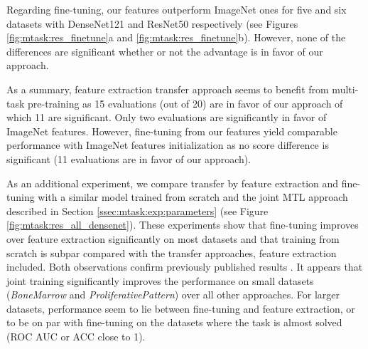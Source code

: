 Regarding fine-tuning, our features outperform ImageNet ones for five and six datasets with DenseNet121 and ResNet50 respectively (see Figures \ref{fig:mtask:res_finetune}a and \ref{fig:mtask:res_finetune}b). However, none of the differences are significant whether or not the advantage is in favor of our approach.

As a summary, feature extraction transfer approach seems to benefit from multi-task pre-training as 15 evaluations (out of 20) are in favor of our approach of which 11 are significant. Only two evaluations are significantly in favor of ImageNet features.  However, fine-tuning from our features yield comparable performance with ImageNet features initialization as no score difference is significant (11 evaluations are in favor of our approach).


As an additional experiment, we compare transfer by feature extraction and fine-tuning with a similar model trained from scratch and the joint MTL approach described in Section \ref{ssec:mtask:exp:parameters} (see Figure \ref{fig:mtask:res_all_densenet}). These experiments show that fine-tuning improves over feature extraction significantly on most datasets and that training from scratch is subpar compared with the transfer approaches, feature extraction included. Both observations confirm previously published results \cite{mormont2018comparison, ponzio2019dealing, tajbakhsh2016convolutional,shin2016deep}. It appears that joint training significantly improves the performance on small datasets (\textit{BoneMarrow} and \textit{ProliferativePattern}) over all other approaches. For larger datasets, performance seem to lie between fine-tuning and feature extraction, or to be on par with fine-tuning on the datasets where the task is almost solved (ROC AUC or ACC close to 1). 



